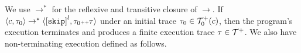 We use $\to^*$ for the reflexive and transitive closure of $\to$. 
If $\config{c, \trace_0} \rightarrow^{*} \config{\clabel{\eskip}^l, \trace_0 \tracecat \trace}$ under an initial trace 
$\mathtt{\tau}_0 \in \mathcal{T}^{+}_0(c)$,
then the program's execution terminates and produces a finite execution trace $\mathtt{\tau} \in \mathcal{T}^{+}$. We also have non-terminating execution defined as follows.
